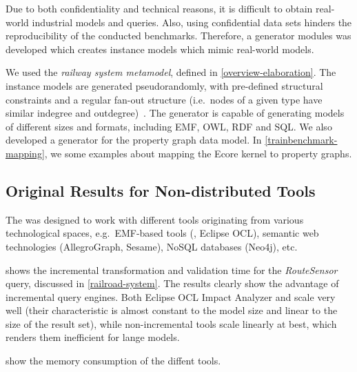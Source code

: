 Due to both confidentiality and technical reasons, it is difficult to obtain real-world industrial models and queries. Also, using confidential data sets hinders the reproducibility of the conducted benchmarks. Therefore, a generator modules was developed which creates instance models which mimic real-world models.

We used  the \emph{railway system metamodel}, defined in \autoref{overview-elaboration}. The instance models are generated pseudorandomly, with pre-defined structural constraints and a regular fan-out structure (i.e.\ nodes of a given type have similar indegree and outdegree)~\cite{ASE2013}. The generator is capable of generating models of different sizes and formats, including EMF, OWL, RDF and SQL. We also developed a generator for the property graph data model. In \autoref{trainbenchmark-mapping}, we some examples about mapping the Ecore kernel to property graphs.

\subsection{Original Results for Non-distributed Tools}


The \tb{} was designed to work with different tools originating from various technological spaces, e.g.\ EMF-based tools (\eiq{}, Eclipse OCL), semantic web technologies (AllegroGraph, Sesame), NoSQL databases (Neo4j), etc.

 shows the incremental transformation and validation time for the \emph{RouteSensor} query, discussed in \autoref{railroad-system}. The results clearly show the advantage of incremental query engines. Both Eclipse OCL Impact Analyzer and \eiq{} scale very well (their characteristic is almost constant to the model size and linear to the size of the result set), while non-incremental tools scale linearly at best, which renders them inefficient for lange models.



 show the memory consumption of the diffent tools.


